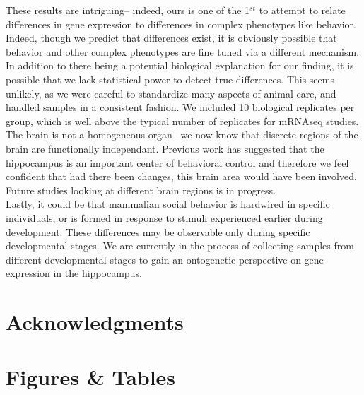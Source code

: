 \documentclass[10.5pt]{article}
\begin{document}
\noindent
These results are intriguing-- indeed, ours is one of the 1$^{st}$ to attempt to relate differences in gene expression to differences in complex phenotypes like behavior. Indeed, though we predict that differences exist, it is obviously possible that behavior and other complex phenotypes are fine tuned via a different mechanism.\\

\noindent
In addition to there being a potential biological explanation for our finding, it is possible that we lack statistical power to detect true differences. This seems unlikely, as we were careful to standardize many aspects of animal care, and handled samples in a consistent fashion. We included 10 biological replicates per group, which is well above the typical number of replicates for mRNAseq studies.    \\

\noindent
The brain is not a homogeneous organ-- we now know that discrete regions of the brain are functionally independant. Previous work has suggested that the hippocampus is an important center of behavioral control \citep{Beery:2008do,Pravosudov:2012faa,Weaver:2006by} and therefore we feel confident that had there been changes, this brain area would have been involved.  Future studies looking at different brain regions is in progress. \\

\noindent
Lastly, it could be that mammalian social behavior is hardwired in specific individuals, or is formed in response to stimuli experienced earlier during development. These differences may be observable only during specific developmental stages. We are currently in the process of collecting samples from different developmental stages to gain an ontogenetic perspective on gene expression in the hippocampus.  \\
 



\section*{Acknowledgments}
\noindent


\vspace{10mm}

\singlespacing



\section*{Figures \& Tables}
\end{document}
